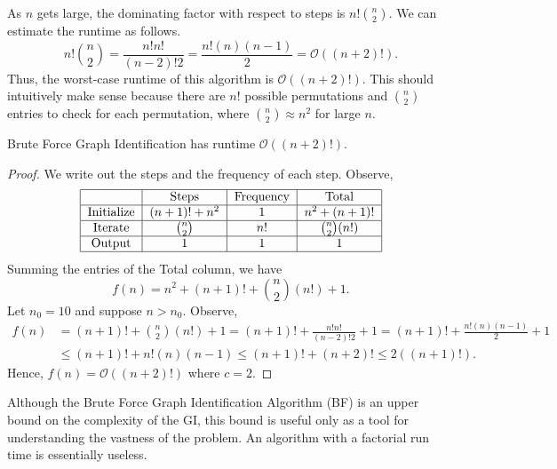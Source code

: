 \begin{example}
		As $n$ gets large, the dominating factor with respect to steps is $n!{n\choose 2}$. We can estimate the runtime as follows. 
		\[n!{n\choose 2}=\frac{n!n!}{(n-2)!2}=\frac{n!(n)(n-1)}{2}=\mathcal{O}((n+2)!).\]
		Thus, the worst-case runtime of this algorithm is $\mathcal{O}((n+2)!)$. This should intuitively make sense because there are $n!$ possible permutations and ${n\choose 2}$ entries to check for each permutation, where ${n\choose2}\approx n^2$ for large $n$.
	\end{example}
	\begin{theorem}
		Brute Force Graph Identification has runtime $\mathcal{O}((n+2)!)$.
	\end{theorem}
	\begin{proof}
		We write out the steps and the frequency of each step. Observe,
		\[\begin{tabular}{|c|c|c|c|}
			\hline
			& Steps&Frequency&Total\\
			\hline
			Initialize&$(n+1)!+n^2$&1&$n^2+(n+1)!$\\
			\hline
			Iterate&${n\choose 2}$&$n!$&${n\choose2}(n!)$\\
			\hline
			Output&1&1&1\\
			\hline
		\end{tabular}\]
		Summing the entries of the Total column, we have\[f(n)=n^2+(n+1)!+{n\choose2}(n!)+1.\]
		Let $n_0=10$ and suppose $n>n_0$. Observe,
		\begin{align*}
			f(n)&=(n+1)!+{n\choose2}(n!)+1=(n+1)!+\frac{n!n!}{(n-2)!2}+1=(n+1)!+\frac{n!(n)(n-1)}{2}+1\\
			&\le(n+1)!+n!(n)(n-1)\le(n+1)!+(n+2)!\le2((n+1)!).
		\end{align*}
		Hence, $f(n)=\mathcal{O}((n+2)!)$ where $c=2$.
	\end{proof}
Although the Brute Force Graph Identification Algorithm (BF) is an upper bound on the complexity of the GI, this bound is useful only as a tool for understanding the vastness of the problem. An algorithm with a factorial run time is essentially useless. 
